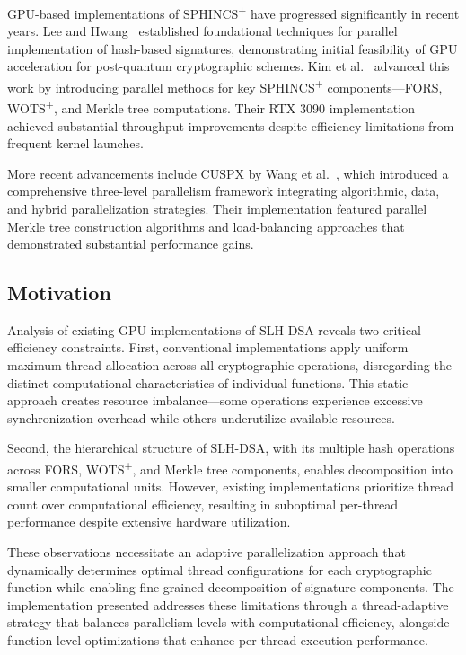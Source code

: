 \documentclass[journal]{IEEEtran}
\begin{document}
GPU-based implementations of SPHINCS\textsuperscript{+} have progressed significantly in recent years. Lee and Hwang~\cite{Lee2022} established foundational techniques for parallel implementation of hash-based signatures, demonstrating initial feasibility of GPU acceleration for post-quantum cryptographic schemes. Kim et al.~\cite{Kim2024} advanced this work by introducing parallel methods for key SPHINCS\textsuperscript{+} components—FORS, WOTS\textsuperscript{+}, and Merkle tree computations. Their RTX 3090 implementation achieved substantial throughput improvements despite efficiency limitations from frequent kernel launches.

More recent advancements include CUSPX by Wang et al.~\cite{Wang2025}, which introduced a comprehensive three-level parallelism framework integrating algorithmic, data, and hybrid parallelization strategies. Their implementation featured parallel Merkle tree construction algorithms and load-balancing approaches that demonstrated substantial performance gains.

\subsection{Motivation}

Analysis of existing GPU implementations of SLH-DSA reveals two critical efficiency constraints. First, conventional implementations apply uniform maximum thread allocation across all cryptographic operations, disregarding the distinct computational characteristics of individual functions. This static approach creates resource imbalance—some operations experience excessive synchronization overhead while others underutilize available resources.

Second, the hierarchical structure of SLH-DSA, with its multiple hash operations across FORS, WOTS\textsuperscript{+}, and Merkle tree components, enables decomposition into smaller computational units. However, existing implementations prioritize thread count over computational efficiency, resulting in suboptimal per-thread performance despite extensive hardware utilization.

These observations necessitate an adaptive parallelization approach that dynamically determines optimal thread configurations for each cryptographic function while enabling fine-grained decomposition of signature components. The implementation presented addresses these limitations through a thread-adaptive strategy that balances parallelism levels with computational efficiency, alongside function-level optimizations that enhance per-thread execution performance.
\end{document}

